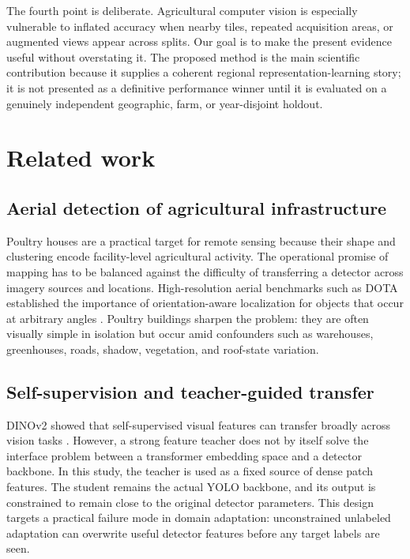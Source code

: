 \documentclass[preprint,12pt,authoryear]{elsarticle}
\begin{document}
The fourth point is deliberate. Agricultural computer vision is especially vulnerable to inflated accuracy when nearby tiles, repeated acquisition areas, or augmented views appear across splits. Our goal is to make the present evidence useful without overstating it. The proposed method is the main scientific contribution because it supplies a coherent regional representation-learning story; it is not presented as a definitive performance winner until it is evaluated on a genuinely independent geographic, farm, or year-disjoint holdout.

\section{Related work}
\label{sec:related}

\subsection{Aerial detection of agricultural infrastructure}

Poultry houses are a practical target for remote sensing because their shape and clustering encode facility-level agricultural activity. The operational promise of mapping has to be balanced against the difficulty of transferring a detector across imagery sources and locations. High-resolution aerial benchmarks such as DOTA established the importance of orientation-aware localization for objects that occur at arbitrary angles \citep{xia2018dota}. Poultry buildings sharpen the problem: they are often visually simple in isolation but occur amid confounders such as warehouses, greenhouses, roads, shadow, vegetation, and roof-state variation.

\subsection{Self-supervision and teacher-guided transfer}

DINOv2 showed that self-supervised visual features can transfer broadly across vision tasks \citep{oquab2023dinov2}. However, a strong feature teacher does not by itself solve the interface problem between a transformer embedding space and a detector backbone. In this study, the teacher is used as a fixed source of dense patch features. The student remains the actual YOLO backbone, and its output is constrained to remain close to the original detector parameters. This design targets a practical failure mode in domain adaptation: unconstrained unlabeled adaptation can overwrite useful detector features before any target labels are seen.
\end{document}
